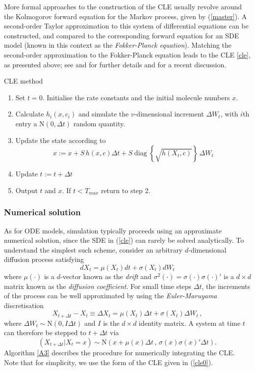 \documentclass[12pt, DIV12]{scrartcl}
\begin{document}
More formal approaches to the construction of the CLE usually revolve around the
Kolmogorov forward equation for the Markov process, given by (\ref{master}). A
second-order Taylor approximation to this system of differential equations can
be constructed, and compared to the corresponding forward equation for an SDE
model (known in this context as the \emph{Fokker-Planck equation}). Matching the
second-order approximation to the Fokker-Planck equation leads to the CLE
\eqref{cle}, as presented above; see \cite{Gillespie92b} and \cite{Gillespie00}
for further details and \cite{golightly11} for a recent discussion.
\begin{algorithm}[t]
\caption{CLE method}\label{A3}
\begin{enumerate}
\item Set $t=0$. Initialise the rate constants and the initial molecule numbers $x$.
\item Calculate $h_i(x,c_i)$ and simulate the $v$-dimensional increment $\Delta
  W_t$, with $i$th entry a $\textrm{N}(0,\Delta t)$ random quantity.
\item Update the state according to 
\[
x := x+S\,h(x,c)\Delta t +
S\operatorname{diag}\left\{\sqrt{h(X_t,c)}\right\}\,\Delta W_t
\]
\item Update $t:=t+\Delta t$
\item Output $t$ and $x$. If $t<T_{max}$ return to step 2.
\end{enumerate}
\end{algorithm}

\subsubsection{Numerical solution}

As for ODE models, simulation typically proceeds using an approximate numerical
solution, since the SDE in (\ref{cle}) can rarely be solved analytically. To
understand the simplest such scheme, consider an arbitrary $d$-dimensional
diffusion process satisfying
\[
{d}X_t = \mu(X_t){d}t + \sigma(X_{t}){d}W_t
\]
where $\mu(\cdot)$ is a $d$-vector known as the \emph{drift} and
$\sigma^{2}(\cdot)=\sigma(\cdot)\sigma(\cdot)'$ is a $d\times d$ matrix known as
the \emph{diffusion coefficient}. For small time steps $\Delta t$, the
increments of the process can be well approximated by using the
\emph{Euler-Maruyama} discretisation
\[
X_{t+\Delta t}-X_{t} \equiv \Delta X_{t} = \mu(X_t)\Delta t + \sigma(X_{t})\Delta W_t\,,
\]
where $\Delta W_t\sim \textrm{N}(0,I\Delta t)$ and $I$ is the $d\times d$ identity matrix. 
A system at time $t$ can therefore be stepped to $t+\Delta t$ via
\[
\left(X_{t+\Delta t}|X_{t}=x\right)\sim \textrm{N}\left(x+\mu(x)\Delta t\,,\,\sigma(x)\sigma(x)'\Delta t\right).
\] 
Algorithm \ref{A3} describes the procedure for numerically integrating the CLE.
Note that for simplicity, we use the form of the CLE given in (\ref{cle0}).
\end{document}
